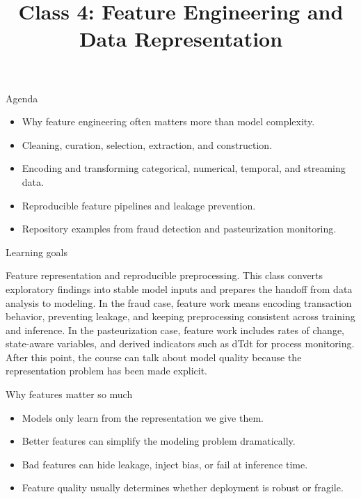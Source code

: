 

\title{Class 4: Feature Engineering and Data Representation}
\author{\coursename}
\date{}



\frame{\titlepage \coursefooter}

\begin{frame}{Agenda}
\begin{itemize}
\item Why feature engineering often matters more than model complexity.
\item Cleaning, curation, selection, extraction, and construction.
\item Encoding and transforming categorical, numerical, temporal, and streaming data.
\item Reproducible feature pipelines and leakage prevention.
\item Repository examples from fraud detection and pasteurization monitoring.
\end{itemize}
\coursefooter
\end{frame}

\begin{frame}{Learning goals}
\coursefooter
\end{frame}

\coursecontextframe
{Feature representation and reproducible preprocessing.}
{This class converts exploratory findings into stable model inputs and prepares the handoff from data analysis to modeling.}
{In the fraud case, feature work means encoding transaction behavior, preventing leakage, and keeping preprocessing consistent across training and inference.}
{In the pasteurization case, feature work includes rates of change, state-aware variables, and derived indicators such as dTdt for process monitoring.}
{After this point, the course can talk about model quality because the representation problem has been made explicit.}

\begin{frame}{Why features matter so much}
\begin{itemize}
\item Models only learn from the representation we give them.
\item Better features can simplify the modeling problem dramatically.
\item Bad features can hide leakage, inject bias, or fail at inference time.
\item Feature quality usually determines whether deployment is robust or fragile.
\end{itemize}
\coursefooter
\end{frame}

